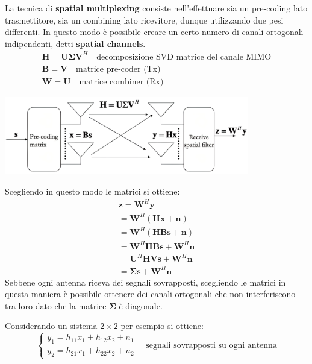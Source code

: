 La tecnica di \textbf{spatial multiplexing} consiste nell'effettuare sia un pre-coding lato trasmettitore, sia un combining lato ricevitore, dunque utilizzando due pesi differenti. In questo modo è possibile creare un certo numero di canali ortogonali indipendenti, detti \textbf{spatial channels}.
\[
    \begin{array}{ll}
        \mathbf{H} = \mathbf{U} \mathbf{\Sigma} \mathbf{V}^H \quad \text{decomposizione SVD matrice del canale MIMO} \\
        \mathbf{B} = \mathbf{V} \quad \text{matrice pre-coder (Tx)} \\
        \mathbf{W} = \mathbf{U} \quad \text{matrice combiner (Rx)}
    \end{array}
\]
\begin{center}
    \includegraphics[width=0.8\textwidth]{imgs/mimo.jpg}
\end{center}

Scegliendo in questo modo le matrici si ottiene:
\[
    \begin{array}{ll}
        \mathbf{z} = \mathbf{W}^H \mathbf{y}  \\
        = \mathbf{W}^H \left( \mathbf{H} \mathbf{x} + \mathbf{n}  \right) \\  
        = \mathbf{W}^H \left( \mathbf{H} \mathbf{B} \mathbf{s} + \mathbf{n} \right) \\
        = \mathbf{W}^H \mathbf{H} \mathbf{B} \mathbf{s} + \mathbf{W}^H \mathbf{n}  \\
        = \mathbf{U}^H \mathbf{H} \mathbf{V} \mathbf{s} + \mathbf{W}^H \mathbf{n} \\
        = \mathbf{\Sigma} \mathbf{s} + \mathbf{W}^H \mathbf{n}
    \end{array}
\]
Sebbene ogni antenna riceva dei segnali sovrapposti, scegliendo le matrici in questa maniera è possibile ottenere dei canali ortogonali che non interferiscono tra loro dato che la matrice $\mathbf{\Sigma}$ è diagonale.

Considerando un sistema $2 \times 2$ per esempio si ottiene:
\[
    \begin{cases*}
        y_1 = h_{11} x_1 + h_{12} x_2 + n_1 \\
        y_2 = h_{21} x_1 + h_{22} x_2 + n_2
    \end{cases*}
    \quad
    \text{segnali sovrapposti su ogni antenna}
\]

